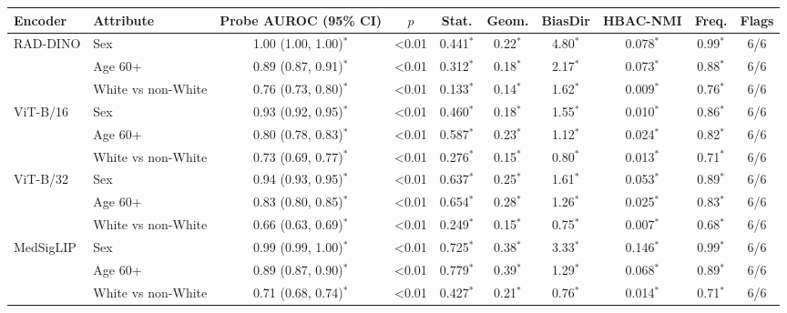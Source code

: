 \begin{tabular}{llcccccccc}
\toprule
Encoder & Attribute & Probe AUROC (95\% CI) & $p$ & Stat. & Geom. & BiasDir & HBAC-NMI & Freq. & Flags \\
\midrule
RAD-DINO & Sex & 1.00 (1.00, 1.00)$^{*}$ & <0.01 & 0.441$^{*}$ & 0.22$^{*}$ & 4.80$^{*}$ & 0.078$^{*}$ & 0.99$^{*}$ & 6/6 \\
 & Age 60+ & 0.89 (0.87, 0.91)$^{*}$ & <0.01 & 0.312$^{*}$ & 0.18$^{*}$ & 2.17$^{*}$ & 0.073$^{*}$ & 0.88$^{*}$ & 6/6 \\
 & White vs non-White & 0.76 (0.73, 0.80)$^{*}$ & <0.01 & 0.133$^{*}$ & 0.14$^{*}$ & 1.62$^{*}$ & 0.009$^{*}$ & 0.76$^{*}$ & 6/6 \\
\midrule
ViT-B/16 & Sex & 0.93 (0.92, 0.95)$^{*}$ & <0.01 & 0.460$^{*}$ & 0.18$^{*}$ & 1.55$^{*}$ & 0.010$^{*}$ & 0.86$^{*}$ & 6/6 \\
 & Age 60+ & 0.80 (0.78, 0.83)$^{*}$ & <0.01 & 0.587$^{*}$ & 0.23$^{*}$ & 1.12$^{*}$ & 0.024$^{*}$ & 0.82$^{*}$ & 6/6 \\
 & White vs non-White & 0.73 (0.69, 0.77)$^{*}$ & <0.01 & 0.276$^{*}$ & 0.15$^{*}$ & 0.80$^{*}$ & 0.013$^{*}$ & 0.71$^{*}$ & 6/6 \\
\midrule
ViT-B/32 & Sex & 0.94 (0.93, 0.95)$^{*}$ & <0.01 & 0.637$^{*}$ & 0.25$^{*}$ & 1.61$^{*}$ & 0.053$^{*}$ & 0.89$^{*}$ & 6/6 \\
 & Age 60+ & 0.83 (0.80, 0.85)$^{*}$ & <0.01 & 0.654$^{*}$ & 0.28$^{*}$ & 1.26$^{*}$ & 0.025$^{*}$ & 0.83$^{*}$ & 6/6 \\
 & White vs non-White & 0.66 (0.63, 0.69)$^{*}$ & <0.01 & 0.249$^{*}$ & 0.15$^{*}$ & 0.75$^{*}$ & 0.007$^{*}$ & 0.68$^{*}$ & 6/6 \\
\midrule
MedSigLIP & Sex & 0.99 (0.99, 1.00)$^{*}$ & <0.01 & 0.725$^{*}$ & 0.38$^{*}$ & 3.33$^{*}$ & 0.146$^{*}$ & 0.99$^{*}$ & 6/6 \\
 & Age 60+ & 0.89 (0.87, 0.90)$^{*}$ & <0.01 & 0.779$^{*}$ & 0.39$^{*}$ & 1.29$^{*}$ & 0.068$^{*}$ & 0.89$^{*}$ & 6/6 \\
 & White vs non-White & 0.71 (0.68, 0.74)$^{*}$ & <0.01 & 0.427$^{*}$ & 0.21$^{*}$ & 0.76$^{*}$ & 0.014$^{*}$ & 0.71$^{*}$ & 6/6 \\
\bottomrule
\end{tabular}
